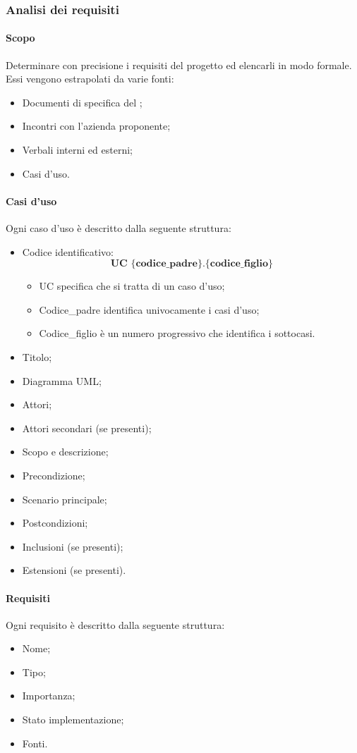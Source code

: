 \subsubsection{Analisi dei requisiti}
\paragraph{Scopo}\Spazio
Determinare con precisione i requisiti del progetto ed elencarli in modo formale. Essi vengono estrapolati da varie fonti:
\begin{itemize}
	\item Documenti di specifica del ;
	\item Incontri con l'azienda proponente;
	\item Verbali interni ed esterni;
	\item Casi d'uso.
\end{itemize}
\paragraph{Casi d'uso}\Spazio
Ogni caso d'uso è descritto dalla seguente struttura:
\begin{itemize}
	\item Codice identificativo: $$ \textbf{UC \{codice\_padre\}.\{codice\_figlio\}  } $$
		\begin{itemize}
				\item UC specifica che si tratta di un caso d'uso;
				\item Codice\_padre identifica univocamente i casi d'uso;
				\item Codice\_figlio è un numero progressivo che identifica i sottocasi.
		\end{itemize}
	\item Titolo;
	\item Diagramma UML;
	\item Attori;
	\item Attori secondari (se presenti);
	\item Scopo e descrizione;
	\item Precondizione;
	\item Scenario principale;
	\item Postcondizioni;
	\item Inclusioni (se presenti);
	\item Estensioni (se presenti).
\end{itemize}
\paragraph{Requisiti}\Spazio
Ogni requisito è descritto dalla seguente struttura:
\begin{itemize}
	\item Nome;
	\item Tipo;
	\item Importanza;
	\item Stato implementazione;
	\item Fonti.
\end{itemize}

